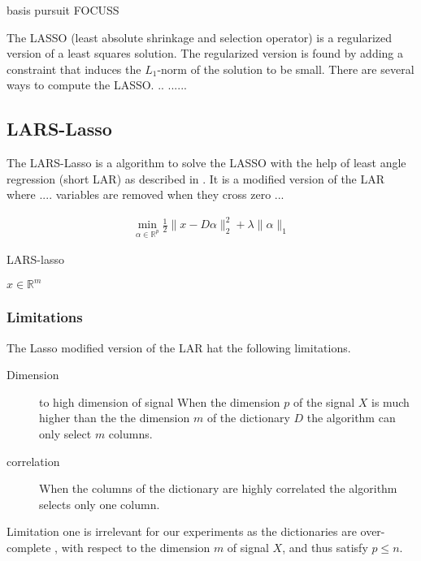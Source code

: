 basis pursuit\cite{} 
FOCUSS \cite{}

The LASSO (least absolute shrinkage and selection operator) is a regularized version of a least squares solution.
The regularized version is found by adding a constraint that induces the $L_1$-norm of the solution to be small. \cite{Tibshirani1998}
There are several ways to compute the LASSO. .. ...... \cite{} 

\subsection {LARS-Lasso}
\label{sec:lars}
The LARS-Lasso is a algorithm to solve the LASSO with the help of least angle regression (short LAR)
as described in \cite{Efron2004}. It is a modified version of the LAR where .... variables are removed when they cross zero ...


\begin{align}
\min_{\alpha\in\mathbb{R}^{p}}  \frac{1}{2} \lVert x - D\alpha \rVert^{2}_{2} + \lambda \lVert \alpha \rVert_{1}
\end{align}

\begin{algorithm}
\caption{LARS-lasso}
\begin{algorithmic}[1]
\REQUIRE $x \in \mathbb{R}^m$
\end{algorithmic}
\end{algorithm}

\subsubsection{Limitations}
The Lasso modified version of the LAR hat the following limitations.
\begin{description}
 \item[Dimension] to high dimension of signal When the dimension $p$ of the signal $X$ is 
much higher than the the dimension $m$ of the dictionary $D$ the algorithm can only select $m$ columns.

\item[correlation] When the columns of the dictionary are highly correlated the algorithm
selects only one column.
\end{description}

Limitation one is irrelevant for our experiments as the dictionaries are over-complete 
, with respect to the dimension $m$ of signal $X$, and thus satisfy $p\leq n$.

